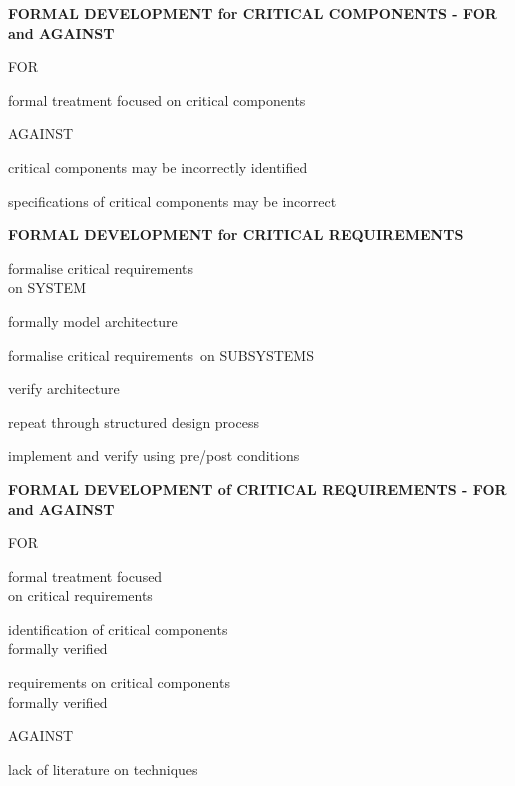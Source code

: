 \begin{slide}{}
\begin{center}
{\bf  FORMAL DEVELOPMENT
for CRITICAL COMPONENTS
-
FOR and AGAINST}

FOR

formal treatment focused
on critical components

AGAINST

critical components may be
incorrectly identified

specifications of critical
components may be incorrect

\end{center}

\end{slide}

\begin{slide}{}
\begin{center}
{\bf  FORMAL DEVELOPMENT
for CRITICAL REQUIREMENTS}


formalise critical requirements\\
on SYSTEM

formally model architecture

formalise critical requirements\
on SUBSYSTEMS

verify architecture

repeat through structured design process

implement and verify
using pre/post conditions

\end{center}
\end{slide}

\begin{slide}{}
\begin{center}
{\bf FORMAL DEVELOPMENT
of CRITICAL REQUIREMENTS
-
FOR and AGAINST}

FOR

formal treatment focused\\
on critical requirements

identification of critical components\\
formally verified

requirements on critical components\\
formally verified


AGAINST

lack of literature on techniques
\end{center}

\end{slide}

